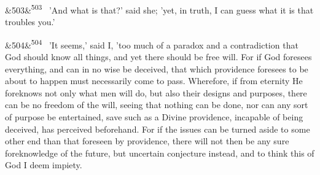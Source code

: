 \documentclass[12pt]{article}
\newcommand{\para}[1][]{\par\noindent\ifx&#1&\else\textsuperscript{\footnotesize #1}~\fi}
\begin{document}
\para[503] 'And what is that?' said she; 'yet, in truth, I can guess what it is that troubles you.'

\para[504] 'It seems,' said I, 'too much of a paradox and a contradiction that God should know all things, and yet there should be free will. For if God foresees everything, and can in no wise be deceived, that which providence foresees to be about to happen must necessarily come to pass. Wherefore, if from eternity He foreknows not only what men will do, but also their designs and purposes, there can be no freedom of the will, seeing that nothing can be done, nor can any sort of purpose be entertained, save such as a Divine providence, incapable of being deceived, has perceived beforehand. For if the issues can be turned aside to some other end than that foreseen by providence, there will not then be any sure foreknowledge of the future, but uncertain conjecture instead, and to think this of God I deem impiety.
\end{document}
